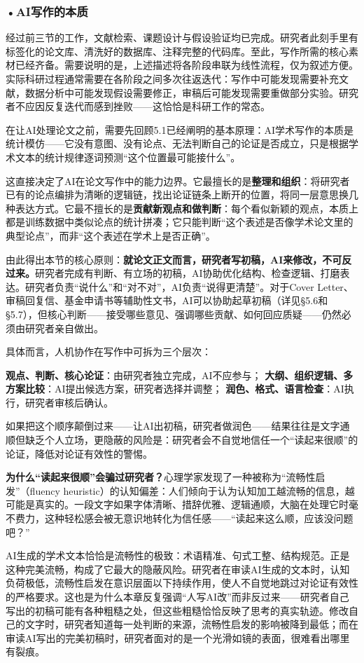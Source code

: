 \subsubsection*{\textbf{•AI写作的本质}}

经过前三节的工作，文献检索、课题设计与假设验证均已完成。研究者此刻手里有标签化的论文库、清洗好的数据库、注释完整的代码库。至此，写作所需的核心素材已经齐备。需要说明的是，上述描述将各阶段串联为线性流程，仅为叙述方便。实际科研过程通常需要在各阶段之间多次往返迭代：写作中可能发现需要补充文献，数据分析中可能发现假设需要修正，审稿后可能发现需要重做部分实验。研究者不应因反复迭代而感到挫败——这恰恰是科研工作的常态。

在让AI处理论文之前，需要先回顾5.1已经阐明的基本原理：AI学术写作的本质是统计模仿——它没有意图、没有论点、无法判断自己的论证是否成立，只是根据学术文本的统计规律逐词预测``这个位置最可能接什么''。

这直接决定了AI在论文写作中的能力边界。它最擅长的是\textbf{整理和组织}：将研究者已有的论点编排为清晰的逻辑链，找出论证链条上断开的位置，将同一层意思换几种表达方式。它最不擅长的是\textbf{贡献新观点和做判断}：每个看似新颖的观点，本质上都是训练数据中类似论点的统计拼凑；它只能判断``这个表述是否像学术论文里的典型论点''，而非``这个表述在学术上是否正确''。

由此得出本节的核心原则：\textbf{就论文正文而言，研究者写初稿，AI来修改，不可反过来。}研究者完成有判断、有立场的初稿，AI协助优化结构、检查逻辑、打磨表达。研究者负责``说什么''和``对不对''，AI负责``说得更清楚''。对于Cover Letter、审稿回复信、基金申请书等辅助性文书，AI可以协助起草初稿（详见\S5.6和\S5.7），但核心判断——接受哪些意见、强调哪些贡献、如何回应质疑——仍然必须由研究者亲自做出。

具体而言，人机协作在写作中可拆为三个层次：

\textbf{观点、判断、核心论证}：由研究者独立完成，AI不应参与；
\textbf{大纲、组织逻辑、多方案比较}：AI提出候选方案，研究者选择并调整；
\textbf{润色、格式、语言检查}：AI执行，研究者审核后确认。

如果把这个顺序颠倒过来——让AI出初稿，研究者做润色——结果往往是文字通顺但缺乏个人立场，更隐蔽的风险是：研究者会不自觉地信任一个``读起来很顺''的论证，降低对论证有效性的警惕。

\begin{funbox}
\textbf{为什么``读起来很顺''会骗过研究者？}心理学家发现了一种被称为``流畅性启发''（fluency heuristic）的认知偏差：人们倾向于认为认知加工越流畅的信息，越可能是真实的。一段文字如果字体清晰、措辞优雅、逻辑通顺，大脑在处理它时毫不费力，这种轻松感会被无意识地转化为信任感——``读起来这么顺，应该没问题吧？''

AI生成的学术文本恰恰是流畅性的极致：术语精准、句式工整、结构规范。正是这种完美流畅，构成了它最大的隐蔽风险。研究者在审读AI生成的文本时，认知负荷极低，流畅性启发在意识层面以下持续作用，使人不自觉地跳过对论证有效性的严格要求。这也是为什么本章反复强调``人写AI改''而非反过来——研究者自己写出的初稿可能有各种粗糙之处，但这些粗糙恰恰反映了思考的真实轨迹。修改自己的文字时，研究者知道每一处判断的来源，流畅性启发的影响被降到最低；而在审读AI写出的完美初稿时，研究者面对的是一个光滑如镜的表面，很难看出哪里有裂痕。
\end{funbox}

